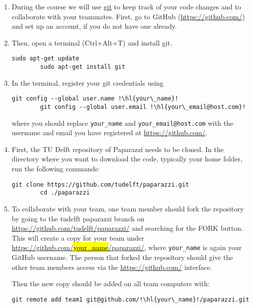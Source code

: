\begin{enumerate}
	
	\item During the course we will use \href{https://git-scm.com/}{git} to keep track of your code changes and to collaborate with your teammates. First, go to GitHub (\url{https://github.com/}) and set up an account, if you do not have one already. 
	
	\item Then, open a terminal (Ctrl+Alt+T) and install git. 
	
	\begin{lstlisting}[style=Bash]
		sudo apt-get update
		sudo apt-get install git
	\end{lstlisting}

	\item In the terminal, register your git credentials using
	\begin{lstlisting}[style=Bash]
		git config --global user.name !\hl{your\_name}!
		git config --global user.email !\hl{your\_email@host.com}!
	\end{lstlisting}
	where you should replace \texttt{your\_name} and \texttt{your\_email@host.com} with the username and email you have registered at \url{https://github.com/}.

	\item First, the TU Delft repository of Paparazzi needs to be cloned. In the directory where you want to download the code, typically your home folder, run the following commands:

	\begin{lstlisting}[style=Bash]
		git clone https://github.com/tudelft/paparazzi.git
		cd ./paparazzi
	\end{lstlisting}

	\item To collaborate with your team, one team member should fork the repository by going to the tudelft paparazzi branch on \href{https://github.com/tudelft/paparazzi/}{https://github.com/tudelft/paparazzi/} and searching for the FORK button. This will create a copy for your team under \href{https://github.com/your_name/paparazzi/}{https://github.com/\hl{your\_name}/paparazzi/}, where \texttt{your\_name} is again your GitHub username. The person that forked the repository should give the other team members access via the \url{https://github.com/} interface.

	Then the new copy should be added on all team computers with:
	\begin{lstlisting}[style=Bash]
		git remote add team1 git@github.com/!\hl{your\_name}!/paparazzi.git
	\end{lstlisting}


\end{enumerate}
